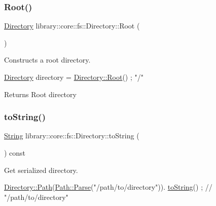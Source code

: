 \subsubsection{\texorpdfstring{Root()}{Root()}}
{\footnotesize\ttfamily \hyperlink{classlibrary_1_1core_1_1fs_1_1_directory}{Directory} library\+::core\+::fs\+::\+Directory\+::\+Root (\begin{DoxyParamCaption}{ }\end{DoxyParamCaption})\hspace{0.3cm}{\ttfamily [static]}}



Constructs a root directory. 


\begin{DoxyCode}
\hyperlink{classlibrary_1_1core_1_1fs_1_1_directory_a3ec39f6cad19a81d520e9a1f2d8bb1f7}{Directory} directory = \hyperlink{classlibrary_1_1core_1_1fs_1_1_directory_a617eb0d4858dd8e2b69a6c5e7b645d8c}{Directory::Root}() ; \textcolor{stringliteral}{"/"}
\end{DoxyCode}


\begin{DoxyReturn}{Returns}
Root directory 
\end{DoxyReturn}
\mbox{\label{classlibrary_1_1core_1_1fs_1_1_directory_a9d9751fccc93342105d3ea3ee29e3a9f}} 
\subsubsection{\texorpdfstring{to\+String()}{toString()}}
{\footnotesize\ttfamily \hyperlink{classlibrary_1_1core_1_1types_1_1_string}{String} library\+::core\+::fs\+::\+Directory\+::to\+String (\begin{DoxyParamCaption}{ }\end{DoxyParamCaption}) const}



Get serialized directory. 


\begin{DoxyCode}
\hyperlink{classlibrary_1_1core_1_1fs_1_1_directory_ae906e33e4659219cf296dd314c7726b8}{Directory::Path}(\hyperlink{classlibrary_1_1core_1_1fs_1_1_path_a6ba644b6609507e724c217bf2020f5ae}{Path::Parse}(\textcolor{stringliteral}{"/path/to/directory"})).
      \hyperlink{classlibrary_1_1core_1_1fs_1_1_directory_a9d9751fccc93342105d3ea3ee29e3a9f}{toString}() ; \textcolor{comment}{// "/path/to/directory"}
\end{DoxyCode}


